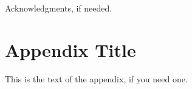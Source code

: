 \documentclass[10pt]{sigplanconf}
\begin{document}
\acks
Acknowledgments, if needed.






\appendix
\section{Appendix Title}

This is the text of the appendix, if you need one.
\end{document}
